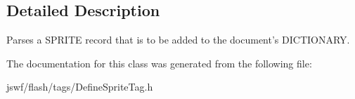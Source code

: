 \subsection{Detailed Description}
Parses a {\ttfamily S\+P\+R\+I\+T\+E} record that is to be added to the document's {\ttfamily D\+I\+C\+T\+I\+O\+N\+A\+R\+Y}. 

The documentation for this class was generated from the following file\+:\begin{DoxyCompactItemize}
\item 
jswf/flash/tags/Define\+Sprite\+Tag.\+h\end{DoxyCompactItemize}
